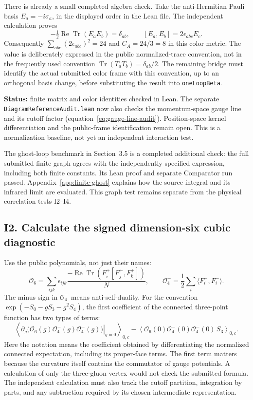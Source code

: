 \documentclass[11pt]{article}
\newcommand{\code}[1]{{\small\nolinkurl{#1}}}
\newcommand{\cO}{\mathcal O}
\begin{document}
There is already a small completed algebra check. Take the
anti-Hermitian Pauli basis $E_a=-i\sigma_a$, in the displayed
order in the Lean file. The independent calculation proves
\[
 -\tfrac12\operatorname{Re}\operatorname{Tr}(E_aE_b)=\delta_{ab},
 \qquad [E_a,E_b]=2\epsilon_{abc}E_c.
\]
Consequently $\sum_{abc}(2\epsilon_{abc})^2=24$ and
$C_A=24/3=8$ in this color metric.
The value is deliberately expressed in the public normalized-trace
convention, not in the frequently used convention
$\operatorname{Tr}(T_aT_b)=\delta_{ab}/2$.
The remaining bridge must identify the actual submitted color
frame with this convention, up to an orthogonal basis change,
before substituting the result into \code{oneLoopBeta}.

\textbf{Status:} finite matrix and color identities checked in Lean.
The separate \code{DiagramReferenceAudit.lean} now also checks the
momentum-space gauge line and its cutoff factor
(equation~\ref{eq:gauge-line-audit}). Position-space kernel
differentiation and the public-frame identification remain open.
This is a normalization baseline, not yet an independent interaction test.

The ghost-loop benchmark in Section~3.5 is a completed additional
check: the full submitted finite graph agrees with the independently
specified expression, including both finite constants. Its Lean proof
and separate Comparator run passed. Appendix~\ref{app:finite-ghost}
explains how the source integral and its infrared limit are evaluated.
This graph test remains separate from the physical correlation tests
I2--I4.

\subsection{I2. Calculate the signed dimension-six cubic diagnostic}

Use the public polynomials, not just their names:
\[
 \cO_6=\sum_{ijk}\epsilon_{ijk}
 \frac{-\operatorname{Re}\operatorname{Tr}
       (F_i^+[F_j^+,F_k^+])}{N},
 \qquad
 \cO_4^-=\frac12\sum_i\langle F_i^-,F_i^-\rangle .
\]
The minus sign in $\cO_4^-$ means anti-self-duality.
For the convention $\exp(-S_0-gS_3-g^2S_4)$, the first coefficient
of the connected three-point function has two types of terms:
\[
 \left\langle
   \left.\partial_g
     \bigl(\cO_6(g)\cO_4^-(g)\cO_4^-(g)\bigr)\right|_{g=0}
 \right\rangle_{0,c}
 -
 \left\langle\cO_6(0)\cO_4^-(0)\cO_4^-(0)\,S_3\right\rangle_{0,c}.
\]
Here the notation means the coefficient obtained by differentiating
the normalized connected expectation, including its proper-face
terms. The first term matters because the curvature itself
contains the commutator of gauge potentials. A calculation of
only the three-gluon vertex would not check the submitted formula.
The independent calculation must also track the cutoff partition,
integration by parts, and any subtraction required by its chosen
intermediate representation.
\end{document}
